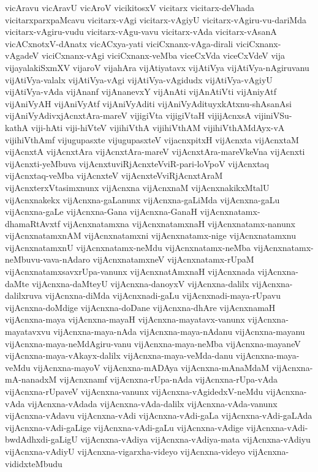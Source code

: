 {vicAravu
vicAravU
vicAroV
vicikitosxV
vicitarx
vicitarx-deVhada
vicitarxparxpaMcavu
vicitarx-vAgi
vicitarx-vAgiyU
vicitarx-vAgiru-vu-dariMda
vicitarx-vAgiru-vudu
vicitarx-vAgu-vavu
vicitarx-vAda
vicitarx-vAsanA
vicACxnotxV-dAnatx
vicACxya-yati
viciCxnanx-vAga-dirali
viciCxnanx-vAgadeV
viciCxnanx-vAgi
viciCxnanx-veMba
viceCxVda
viceCxVdeV
vija
vijayalakiSxmXV
vijaroV
vijahAra
vijAtiyatavx
vijAtiVya
vijAtiVya-nAgiruvanu
vijAtiVya-valalx
vijAtiVya-vAgi
vijAtiVya-vAgidudx
vijAtiVya-vAgiyU
vijAtiVya-vAda
vijAnanf
vijAnanevxY
vijAnAti
vijAnAtiVti
vijAniyAtf
vijAniVyAH
vijAniVyAtf
vijAniVyAditi
vijAniVyAdituyxkAtxnu-shAsanAsi
vijAniVyAdivxjAcnxtAra-mareV
vijigiVta
vijigiVtaH
vijijAcnxsA
vijiniVSu-kathA
viji-hAti
viji-hiVteV
vijihiVthA
vijihiVthAM
vijihiVthAMdAyx-vA
vijihiVthAmf
vijugupasxte
vijugupasxteV
vijacnxpitxH
vijAcnxta
vijAcnxtaM
vijAcnxtA
vijAcnxtAra
vijAcnxtAra-mareV
vijAcnxtAra-mareVkeVna
vijAcnxti
vijAcnxti-yeMbuva
vijAcnxtuviRjAcnxteVviR-pari-loVpoV
vijAcnxtaq
vijAcnxtaq-veMba
vijAcnxteV
vijAcnxteVviRjAcnxtAraM
vijAcnxterxVtasimxnunx
vijAcnxna
vijAcnxnaM
vijAcnxnakikxMtalU
vijAcnxnakekx
vijAcnxna-gaLanunx
vijAcnxna-gaLiMda
vijAcnxna-gaLu
vijAcnxna-gaLe
vijAcnxna-Gana
vijAcnxna-GanaH
vijAcnxnatamx-dhamaRtAvxtf
vijAcnxnatamxna
vijAcnxnatamxnaH
vijAcnxnatamx-nanunx
vijAcnxnatamxnAM
vijAcnxnatamxni
vijAcnxnatamx-nige
vijAcnxnatamxnu
vijAcnxnatamxnU
vijAcnxnatamx-neMdu
vijAcnxnatamx-neMba
vijAcnxnatamx-neMbuvu-vava-nAdaro
vijAcnxnatamxneV
vijAcnxnatamx-rUpaM
vijAcnxnatamxsavxrUpa-vanunx
vijAcnxnatAmxnaH
vijAcnxnada
vijAcnxna-daMte
vijAcnxna-daMteyU
vijAcnxna-danoyxV
vijAcnxna-dalilx
vijAcnxna-dalilxruva
vijAcnxna-diMda
vijAcnxnadi-gaLu
vijAcnxnadi-maya-rUpavu
vijAcnxna-doMdige
vijAcnxna-doDane
vijAcnxna-dhAre
vijAcnxnamaH
vijAcnxna-maya
vijAcnxna-mayaH
vijAcnxna-mayatavx-vanunx
vijAcnxna-mayatavxvu
vijAcnxna-maya-nAda
vijAcnxna-maya-nAdanu
vijAcnxna-mayanu
vijAcnxna-maya-neMdAgiru-vanu
vijAcnxna-maya-neMba
vijAcnxna-mayaneV
vijAcnxna-maya-vAkayx-dalilx
vijAcnxna-maya-veMda-danu
vijAcnxna-maya-veMdu
vijAcnxna-mayoV
vijAcnxna-mADAya
vijAcnxna-mAnaMdaM
vijAcnxna-mA-nanadxM
vijAcnxnamf
vijAcnxna-rUpa-nAda
vijAcnxna-rUpa-vAda
vijAcnxna-rUpaveV
vijAcnxna-vanunx
vijAcnxna-vAgidedxV-neMdu
vijAcnxna-vAda
vijAcnxna-vAdada
vijAcnxna-vAda-dalilx
vijAcnxna-vAda-vanunx
vijAcnxna-vAdavu
vijAcnxna-vAdi
vijAcnxna-vAdi-gaLa
vijAcnxna-vAdi-gaLAda
vijAcnxna-vAdi-gaLige
vijAcnxna-vAdi-gaLu
vijAcnxna-vAdige
vijAcnxna-vAdi-bwdAdhxdi-gaLigU
vijAcnxna-vAdiya
vijAcnxna-vAdiya-mata
vijAcnxna-vAdiyu
vijAcnxna-vAdiyU
vijAcnxna-vigarxha-videyo
vijAcnxna-videyo
vijAcnxna-vididxteMbudu
}
